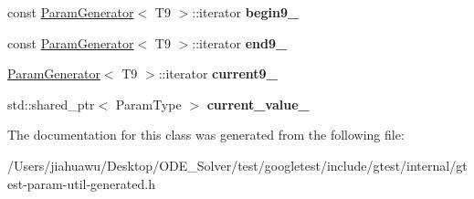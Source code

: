 \begin{DoxyCompactItemize}
\item 
\mbox{\label{classtesting_1_1internal_1_1_cartesian_product_generator9_1_1_iterator_a99069f471668c2f804507cd9af050f26}} 
const \mbox{\hyperlink{classtesting_1_1internal_1_1_param_generator}{Param\+Generator}}$<$ T9 $>$\+::iterator {\bfseries begin9\+\_\+}
\item 
\mbox{\label{classtesting_1_1internal_1_1_cartesian_product_generator9_1_1_iterator_a4046916a22aea7df3959de13dc2ae9be}} 
const \mbox{\hyperlink{classtesting_1_1internal_1_1_param_generator}{Param\+Generator}}$<$ T9 $>$\+::iterator {\bfseries end9\+\_\+}
\item 
\mbox{\label{classtesting_1_1internal_1_1_cartesian_product_generator9_1_1_iterator_a1fc558b062c44ffd7af98afa0ae6ddb2}} 
\mbox{\hyperlink{classtesting_1_1internal_1_1_param_generator}{Param\+Generator}}$<$ T9 $>$\+::iterator {\bfseries current9\+\_\+}
\item 
\mbox{\label{classtesting_1_1internal_1_1_cartesian_product_generator9_1_1_iterator_a0934ef053408f36a601b95b238b76cc5}} 
std\+::shared\+\_\+ptr$<$ Param\+Type $>$ {\bfseries current\+\_\+value\+\_\+}
\end{DoxyCompactItemize}


The documentation for this class was generated from the following file\+:\begin{DoxyCompactItemize}
\item 
/\+Users/jiahuawu/\+Desktop/\+O\+D\+E\+\_\+\+Solver/test/googletest/include/gtest/internal/gtest-\/param-\/util-\/generated.\+h\end{DoxyCompactItemize}
